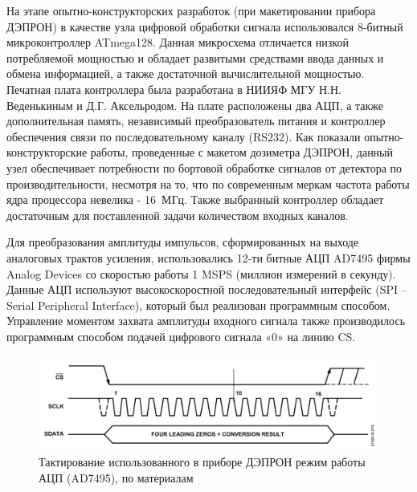 На этапе опытно-конструкторских разработок (при макетировании прибора ДЭПРОН) в качестве узла цифровой обработки сигнала использовался 8-битный микроконтроллер ATmega128. Данная микросхема отличается низкой потребляемой мощностью и обладает развитыми средствами ввода данных и обмена информацией, а также достаточной вычислительной мощностью. Печатная плата контроллера была разработана в НИИЯФ МГУ Н.Н. Веденькиным и Д.Г. Аксельродом. На плате расположены два АЦП, а также дополнительная память, независимый преобразователь питания и контроллер обеспечения связи по последовательному каналу (RS232). Как показали опытно-конструкторские работы, проведенные с макетом дозиметра ДЭПРОН, данный узел обеспечивает потребности по бортовой обработке сигналов от детектора по производительности, несмотря на то, что по современным меркам частота работы ядра процессора невелика - 16~МГц. Также выбранный контроллер обладает достаточным для поставленной задачи количеством входных каналов.

Для преобразования амплитуды импульсов, сформированных на выходе аналоговых трактов усиления, использовались 12-ти битные АЦП AD7495 фирмы Analog Devices со скоростью работы 1 MSPS (миллион измерений в секунду). Данные АЦП используют высокоскоростной последовательный интерфейс (SPI -- Serial Peripheral Interface), который был реализован программным способом. Управление моментом захвата амплитуды входного сигнала также производилось программным способом подачей цифрового сигнала «0» на линию CS. 
\begin{figure}
	\centering
	\includegraphics[width=0.7\linewidth]{images/adc}
	\caption{Тактирование использованного в приборе ДЭПРОН режим работы АЦП (AD7495), по материалам \cite{AnalogDevices2005} }
	\label{fig:adc}
\end{figure}

